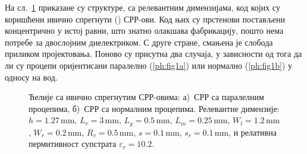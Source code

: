 \documentclass[main.tex]{subfiles}
\begin{document}
\newcommand{\labelaslike}{а)~СРР са паралелним процепима, б)~СРР са нормалним процепима. }
На сл.~\ref{ph:fig1} приказане су структуре, са релевантним димензијама, код којих су коришћени ивично спрегнути () СРР-ови. Код њих су прстенови постављени концентрично у истој равни, што знатно олакшава фабрикацију, пошто нема потребе за двослојним диелектриком. С друге стране, смањена је слобода приликом пројектовања. Поново су присутна два случаја, у зависности од тога да ли су процепи оријентисани паралелно (\ref{ph:fig1a}) или нормално (\ref{ph:fig1b}) у односу на вод.
\begin{figure}[!t]
\centering
{}
\hfill
{}
\caption{Ћелије са ивично спрегнутим СРР-овима: \labelaslike Релевантне димензије: $h=\num{1.27}\,\mathrm{mm}$, $L_r=3\,\mathrm{mm}$, $L_g=\num{0.5}\,\mathrm{mm}$, $L_m=\num{0.25}\,\mathrm{mm}$, $W_l=\num{1.2}\,\mathrm{mm}$, $W_r=\num{0.2}\,\mathrm{mm}$, $R_v=\num{0.5}\,\mathrm{mm}$, $s=\num{0.1}\,\mathrm{mm}$, $s_r=\num{0.1}\,\mathrm{mm}$, и релативна пермитивност супстрата $\varepsilon_r=\num{10.2}$.}
\label{ph:fig1}
\end{figure} 
\end{document}
